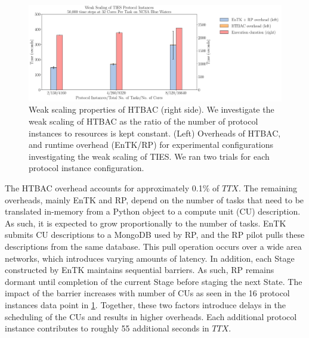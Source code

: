 \begin{figure}
  \centering
   \includegraphics[width=\columnwidth]{./figures/weak_scaling_TIES_instances_50,000_timesteps.pdf}
  \caption{Weak scaling properties of HTBAC (right side). We investigate the
  weak scaling of HTBAC as the ratio of the number of protocol instances to
  resources is kept constant. (Left) Overheads of HTBAC, and runtime overhead (EnTK/RP) for
  experimental configurations investigating the weak scaling of TIES. We ran two trials for each protocol instance configuration.}
\label{fig:weak_scaling}
\end{figure}


The HTBAC overhead accounts for approximately 0.1\% of \(TTX\). The remaining
overheads, mainly EnTK and RP, depend on the number of tasks that need to be
translated in-memory from a Python object to a compute unit (CU) description.
As such, it is expected to grow proportionally to the number of tasks. EnTK
submits CU descriptions to a MongoDB used by RP, and the RP pilot pulls these
descriptions from the same database. This pull operation occurs over a wide
area networks, which introduces varying amounts of latency. In addition, each
Stage constructed by EnTK maintains sequential barriers. As such, RP remains
dormant until completion of the current Stage before staging the next State.
The impact of the barrier increases with number of CUs as seen in the 16
protocol instances data point in \ref{fig:weak_scaling}.  Together, these two
factors introduce delays in the scheduling of the CUs and results in higher
overheads. Each additional protocol instance contributes to roughly 55
additional seconds in \(TTX\).








